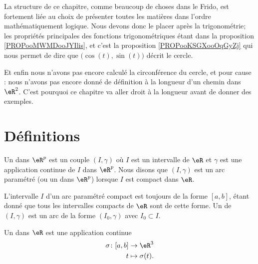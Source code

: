 
La structure de ce chapitre, comme beaucoup de choses dans le Frido, est fortement liée au choix de présenter toutes les matières dans l'ordre mathématiquement logique. Nous devons donc le placer après la trigonométrie; les propriétés principales des fonctions trigonométriques étant dans la proposition \ref{PROPooMWMDooJYIlis}, et c'est la proposition \ref{PROPooKSGXooOqGyZj} qui nous permet de dire que \( \big( \cos(t),\sin(t) \big)\) décrit le cercle.

Et enfin nous n'avons pas encore calculé la circonférence du cercle, et pour cause : nous n'avons pas encore donné de définition à la longueur d'un chemin dans \( \eR^2\). C'est pourquoi ce chapitre va aller droit à la longueur avant de donner des exemples.

\section{Définitions}        \label{SecDeExCPar}

\begin{definition}
    Un  dans $\eR^p$ est un couple $(I,\gamma)$ où $I$ est un intervalle de $\eR$ et $\gamma$ est une application continue de $I$ dans $\eR^p$. Nous disons que $(I,\gamma)$ est un arc paramétré  (ou un  dans $\eR^p$) lorsque $I$ est compact dans $\eR$. 
\end{definition}
L'intervalle $I$ d'un arc paramétré compact est toujours de la forme $[a,b]$, étant donné que tous les intervalles compacts de $\eR$ sont de cette forme. Un  de $(I,\gamma)$ est un arc de la forme $(I_0,\gamma)$ avec $I_0\subset I$.

\begin{definition}
    Un  dans $\eR$ est une application continue
    \begin{equation}
        \begin{aligned}
            \sigma\colon [a,b]&\to \eR^3 \\
            t&\mapsto \sigma(t). 
        \end{aligned}
    \end{equation}
\end{definition}

